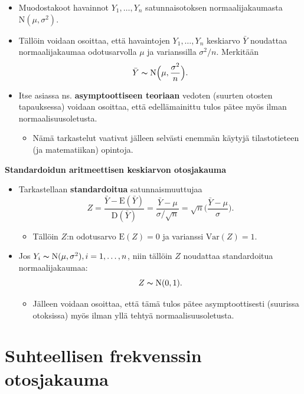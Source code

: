 \documentclass[
]{book}
\providecommand{\tightlist}{%
  \setlength{\itemsep}{0pt}\setlength{\parskip}{0pt}}
\begin{document}
\begin{itemize}
\item
  Muodostakoot havainnot \(Y_1, \ldots, Y_n\) satunnaisotoksen normaalijakaumasta \(\text{N}(\mu, \sigma^2)\).
\item
  Tällöin voidaan osoittaa, että havaintojen \(Y_1, \ldots, Y_n\) keskiarvo \(\bar{Y}\) noudattaa normaalijakaumaa odotusarvolla \(\mu\) ja varianssilla \(\sigma^2/n\). Merkitään
  \[
  \bar{Y} \thicksim \text{N} \Big(\mu, \frac{\sigma^2}{n} \Big).
  \]
\item
  Itse asiassa ns. \textbf{asymptoottiseen teoriaan} vedoten (suurten otosten tapauksessa) voidaan osoittaa, että edellämainittu tulos pätee myös ilman normaalisuusoletusta.

  \begin{itemize}
  \tightlist
  \item
    Nämä tarkastelut vaativat jälleen selvästi enemmän käytyjä tilastotieteen (ja matematiikan) opintoja.
  \end{itemize}
\end{itemize}

\hfill\break

\textbf{Standardoidun aritmeettisen keskiarvon otosjakauma}

\begin{itemize}
\tightlist
\item
  Tarkastellaan \textbf{standardoitua} satunnaismuuttujaa
  \[
  Z = \frac{\bar{Y} - \text{E}(\bar{Y})}{\text{D}(\bar{Y})} = \frac{\bar{Y} - \mu}{\sigma / \sqrt{n}} = \sqrt{n} \Big(\frac{\bar{Y} - \mu}{\sigma}\Big).
  \]

  \begin{itemize}
  \tightlist
  \item
    Tällöin \(Z\):n odotusarvo \(\text{E}(Z) = 0\) ja varianssi \(\mathrm{Var}(Z) = 1\).
  \end{itemize}
\item
  Jos \(Y_i \thicksim \text{N}(\mu, \sigma^2), i=1,\ldots,n\), niin tällöin \(Z\) noudattaa standardoitua normaalijakaumaa:
  \[
  Z \thicksim \text{N}(0,1).
  \]

  \begin{itemize}
  \tightlist
  \item
    Jälleen voidaan osoittaa, että tämä tulos pätee asymptoottisesti (suurissa otoksissa) myös ilman yllä tehtyä normaalisuusoletusta.
  \end{itemize}
\end{itemize}

\hypertarget{alaluku94}{%
\section{Suhteellisen frekvenssin otosjakauma}\label{alaluku94}}
\end{document}
